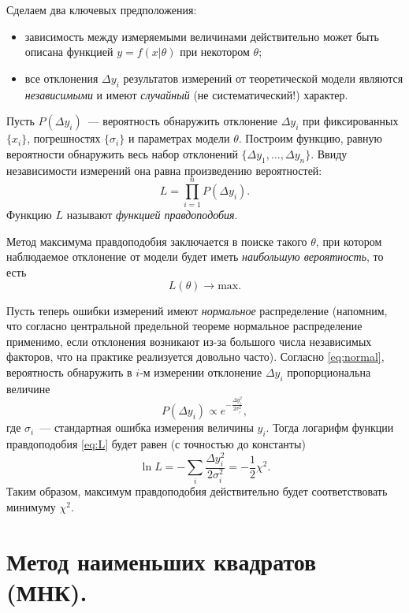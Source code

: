 Сделаем два ключевых предположения:
\begin{itemize}
 \item  зависимость между измеряемыми величинами действительно может
 быть описана функцией $y=f(x|\theta)$ при некотором $\theta$;
 \item все отклонения $\Delta y_i$ результатов измерений от теоретической модели
 являются \emph{независимыми} и имеют \emph{случайный} (не систематический!) характер.
\end{itemize}

Пусть $P(\Delta y_i)$~--- вероятность обнаружить отклонение $\Delta y_i$
при фиксированных $\{x_i\}$, погрешностях $\{\sigma_i\}$ и параметрах модели $\theta$.
Построим функцию, равную вероятности обнаружить
весь набор отклонений $\{\Delta y_1,\ldots,\Delta y_n\}$. Ввиду независимости
измерений она равна произведению вероятностей:
\begin{equation}\label{eq:L}
L =  \prod_{i=1}^n P(\Delta y_i).
\end{equation}
Функцию $L$ называют \emph{функцией правдоподобия}.

Метод максимума правдоподобия заключается в поиске такого $\theta$,
при котором наблюдаемое отклонение от модели будет иметь
\emph{наибольшую вероятность}, то есть
\[
L(\theta) \to \mathrm{max}.
\]

Пусть теперь ошибки измерений имеют \emph{нормальное} распределение
(напомним, что согласно центральной предельной теореме нормальное распределение
применимо, если отклонения возникают из-за большого
числа независимых факторов, что на практике реализуется довольно часто).
Согласно \eqref{eq:normal}, вероятность обнаружить в $i$-м измерении
отклонение $\Delta y_i$ пропорциональна величине
\[
P(\Delta y_i) \propto e^{-\frac{\Delta y_i^2}{2\sigma_i^2}},
\]
где $\sigma_i$~--- стандартная ошибка измерения величины $y_i$. Тогда
логарифм функции правдоподобия \eqref{eq:L} будет равен (с точностью до константы)
\[
 \ln L = - \sum_i \frac{\Delta y_i^2}{2\sigma_i^2} = - \frac12 \chi^2.
\]
Таким образом, максимум правдоподобия действительно будет соответствовать
минимуму $\chi^2$.

\section{Метод наименьших квадратов (МНК).}

